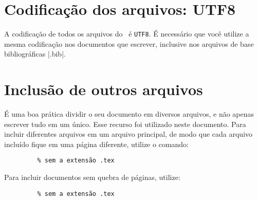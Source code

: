 

\section{Codificação dos arquivos: UTF8}

A codificação de todos os arquivos do \abnTeX\ é \texttt{UTF8}. É necessário que
você utilize a mesma codificação nos documentos que escrever, inclusive nos
arquivos de base bibliográficas |.bib|.



\section{Inclusão de outros arquivos}\label{sec-include}

É uma boa prática dividir o seu documento em diversos arquivos, e não
apenas escrever tudo em um único. Esse recurso foi utilizado neste
documento. Para incluir diferentes arquivos em um arquivo principal,
de modo que cada arquivo incluído fique em uma página diferente, utilize o
comando:

\begin{verbatim}
         % sem a extensão .tex
\end{verbatim}

Para incluir documentos sem quebra de páginas, utilize:

\begin{verbatim}
         % sem a extensão .tex
\end{verbatim}






